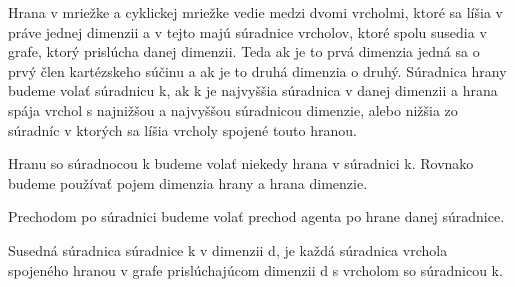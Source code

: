 \begin{ozn}
Hrana v mriežke a cyklickej mriežke vedie medzi dvomi vrcholmi, 
ktoré sa líšia v práve jednej dimenzii a v tejto majú súradnice vrcholov,
ktoré spolu susedia v grafe, ktorý prislúcha danej dimenzii. Teda ak je to
prvá dimenzia jedná sa o prvý člen kartézskeho súčinu a ak je to druhá
dimenzia o druhý. Súradnica hrany budeme volať súradnicu k, ak k je
najvyššia súradnica v danej dimenzii a hrana spája vrchol s najnižšou a
najvyššou súradnicou dimenzie, alebo nižšia zo súradníc v ktorých sa líšia
vrcholy spojené touto hranou.

Hranu so súradnocou k budeme volať niekedy hrana v súradnici k. Rovnako
budeme používať pojem dimenzia hrany a hrana dimenzie.
\end{ozn}
\begin{ozn}
Prechodom po súradnici budeme volať prechod agenta po hrane danej súradnice.
\end{ozn}

\begin{ozn}
Susedná súradnica súradnice k v dimenzii d, je každá súradnica vrchola
spojeného hranou v grafe prislúchajúcom dimenzii d s vrcholom so súradnicou
k.
\end{ozn}



